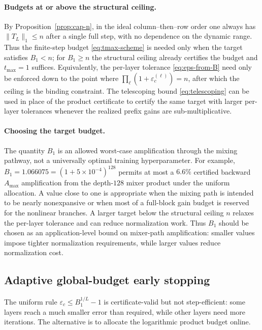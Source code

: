 \documentclass[10pt]{article}
\numberwithin{equation}{section}
\theoremstyle{plain}
\theoremstyle{definition}
\theoremstyle{remark}
\begin{document}
\paragraph{Budgets at or above the structural ceiling.}
By Proposition~\ref{prop:cap-n}, in the ideal column--then--row order one always has
$\|T_L\|_1\le n$ after a single full step, with no dependence on the dynamic range. Thus
the finite-step budget \eqref{eq:tmax-scheme} is needed only when the target satisfies
$B_1<n$; for $B_1\ge n$ the structural ceiling already certifies the budget and
$t_{\max}=1$ suffices. Equivalently, the per-layer tolerance \eqref{eq:eps-from-B} need only
be enforced down to the point where $\prod_\ell(1+\varepsilon_c^{(\ell)})=n$, after which the
ceiling is the binding constraint. The telescoping bound \eqref{eq:telescoping} can be used
in place of the product certificate to certify the same target with larger per-layer
tolerances whenever the realized prefix gains are sub-multiplicative.


\paragraph{Choosing the target budget.}
The quantity \(B_1\) is an allowed worst-case amplification through the mixing
pathway, not a universally optimal training hyperparameter.  For example,
\(B_1=1.066075=(1+5\times10^{-4})^{128}\) permits at most a \(6.6\%\)
certified backward \(A_{\max}\) amplification from the depth-\(128\) mixer
product under the uniform allocation. A value close to one is appropriate when
the mixing path is intended to be nearly nonexpansive or when most of a
full-block gain budget is reserved for the nonlinear branches.  A larger target
below the structural ceiling \(n\) relaxes the per-layer tolerance and can reduce
normalization work. Thus \(B_1\) should be chosen as an application-level bound on
mixer-path amplification: smaller values impose tighter normalization
requirements, while larger values reduce normalization cost.


\subsection{Adaptive global-budget early stopping}\label{subsec:adaptive_global_budget}
The uniform rule $\varepsilon_c\le B_1^{1/L}-1$ is certificate-valid but not step-efficient: some layers reach a much smaller error than required, while other layers need more iterations. The alternative is to allocate the logarithmic product budget online.
\end{document}
